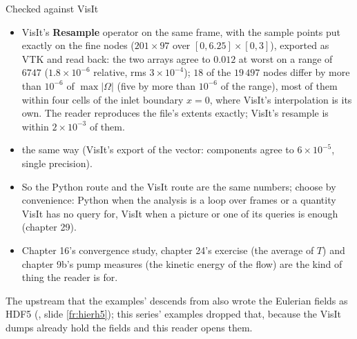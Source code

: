 \documentclass[aspectratio=169,11pt]{beamer}
\newcommand{\gui}[1]{\textsf{\textbf{#1}}}
\begin{document}
\begin{frame}{Checked against VisIt}
\label{fr:check}
\footnotesize
\begin{itemize}
  \item VisIt's \gui{Resample} operator on the same frame, with the sample points put exactly on the fine nodes ($201 \times 97$ over $[0, 6.25] \times [0, 3]$), exported as VTK and read back: the two  arrays agree to $0.012$ at worst on a range of $6747$ ($1.8 \times 10^{-6}$ relative, rms $3 \times 10^{-4}$); $18$ of the $19\,497$ nodes differ by more than $10^{-6}$ of $\max|\Omega|$ (five by more than $10^{-6}$ of the range), most of them within four cells of the inlet boundary $x = 0$, where VisIt's interpolation is its own. The reader reproduces the file's extents exactly; VisIt's resample is within $2 \times 10^{-3}$ of them.
  \item {} the same way (VisIt's export of the vector: components agree to $6 \times 10^{-5}$, single precision).
  \item So the Python route and the VisIt route are the same numbers; choose by convenience: Python when the analysis is a loop over frames or a quantity VisIt has no query for, VisIt when a picture or one of its queries is enough (chapter 29).
  \item Chapter 16's convergence study, chapter 24's exercise (the average of $T$) and chapter 9b's pump measures (the kinetic energy of the flow) are the kind of thing the reader is for.
\end{itemize}
\begin{punchbox}
\scriptsize The upstream  that the examples'  descends from also wrote the Eulerian fields as HDF5 (, slide \ref{fr:hierh5}); this series' examples dropped that, because the VisIt dumps already hold the fields and this reader opens them.
\end{punchbox}
\end{frame}
\end{document}
